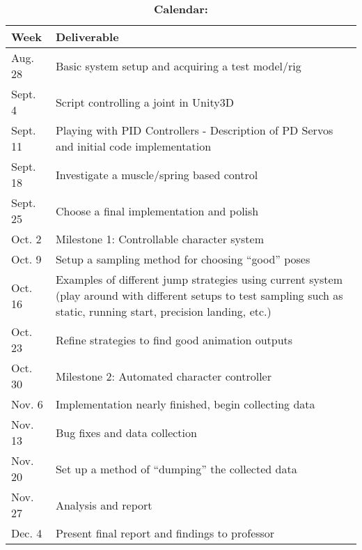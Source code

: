 \documentclass[12pt, letter]{article}
\begin{document}
		\begin{table}[H]
			\centering
			\caption*{\bf \large Calendar:}
			\begin{tabular}{| p{} | p{} |}
				\hline
				\bf Week & \bf Deliverable \\ \hline
				Aug. 28 & Basic system setup and acquiring a test model/rig \\ \hline
				Sept. 4 & Script controlling a joint in Unity3D \\ \hline
				Sept. 11 & Playing with PID Controllers - Description of PD Servos and initial code implementation \\ \hline
				Sept. 18 & Investigate a muscle/spring based control \\ \hline
				Sept. 25 & Choose a final implementation and polish \\ \hline
				Oct. 2 & Milestone 1: Controllable character system \\ \hline
				Oct. 9 & Setup a sampling method for choosing ``good'' poses \\ \hline
				Oct. 16 & Examples of different jump strategies using current system (play around with different setups to test sampling such as static, running start, precision landing, etc.) \\ \hline
				Oct. 23 & Refine strategies to find good animation outputs \\ \hline
				Oct. 30 & Milestone 2: Automated character controller \\ \hline
				Nov. 6 & Implementation nearly finished, begin collecting data \\ \hline
				Nov. 13 & Bug fixes and data collection \\ \hline
				Nov. 20 & Set up a method of ``dumping'' the collected data \\ \hline
				Nov. 27 & Analysis and report \\ \hline
				Dec. 4 & Present final report and findings to professor\\ \hline
			\end{tabular}
		\end{table}
\end{document}
